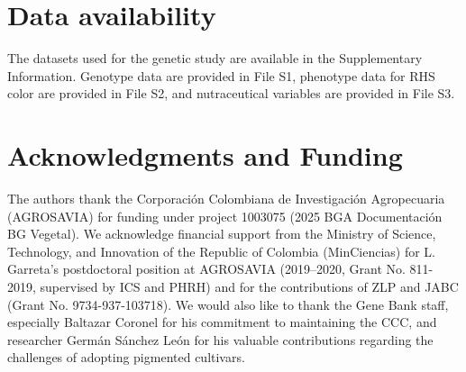 \documentclass[pdflatex,sn-mathphys-ay]{sn-jnl}%
\begin{document}





\section{Data availability}

The datasets used for the genetic study are available in the Supplementary Information. Genotype data are provided in File S1, phenotype data for RHS color are provided in File S2, \textcolor{green!50!black}{and nutraceutical variables are provided in File S3.}

\section{Acknowledgments and Funding}

The authors thank the Corporación Colombiana de Investigación Agropecuaria (AGROSAVIA) for funding under project 1003075 (2025 BGA Documentación BG Vegetal). We acknowledge financial support from the Ministry of Science, Technology, and Innovation of the Republic of Colombia (MinCiencias) for L. Garreta's postdoctoral position at AGROSAVIA (2019–2020, Grant No. 811-2019, supervised by ICS and PHRH) and for the contributions of ZLP and JABC (Grant No. 9734-937-103718). We would also like to thank the Gene Bank staff, especially Baltazar Coronel for his commitment to maintaining the CCC, and researcher Germán Sánchez León for his valuable contributions regarding the challenges of adopting pigmented cultivars.
\end{document}
